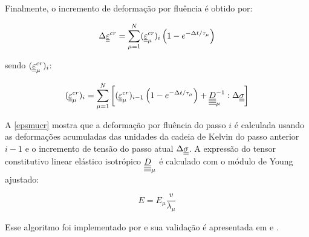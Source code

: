 Finalmente, o incremento de deformação por fluência é obtido por:

\begin{equation}
\Delta \underline{\underline \varepsilon}^{cr} = \sum_{\mu = 1}^{N} (\underline{\underline \varepsilon}^{cr}_{\mu})_i  \left( 1-e^{-\Delta t/\tau_\mu}\right)
\end{equation}

sendo $(\underline{\underline \varepsilon}^{cr}_{\mu})_i$: 

\begin{equation}
\label{epsmucr}
(\underline{\underline \varepsilon}^{cr}_{\mu})_i = \sum_{\mu = 1}^{N}\left[ (\underline{\underline \varepsilon}^{cr}_{\mu})_{i-1}\left( 1-e^{-\Delta t/\tau_\mu}\right) +\underline{\underline{\underline{\underline D}}}_\mu^{-1} : \Delta \underline{\underline \sigma}  \right]
\end{equation}

A \autoref{epsmucr} mostra que a deformação por fluência do passo $i$ é calculada usando as deformações acumuladas das unidades da cadeia de Kelvin do passo anterior $i-1$ e o incremento de tensão do passo atual $\Delta \underline{\underline \sigma}$. A expressão do tensor constitutivo linear elástico isotrópico $\underline{\underline{\underline{\underline D}}}_{\mu}$ é calculado com o módulo de Young ajustado:

\begin{equation}
E = E_\mu\dfrac{v}{\lambda_\mu}
\end{equation}

Esse algoritmo foi implementado por   e sua validação é apresentada em  e .





